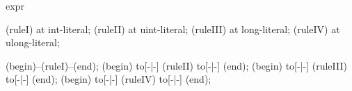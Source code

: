\begin{syntax}{expr}
  
  \node[nonterminal] (ruleI)  at  {int-literal};
  \node[nonterminal] (ruleII) at  {uint-literal};
  \node[nonterminal] (ruleIII) at  {long-literal};
  \node[nonterminal] (ruleIV) at  {ulong-literal};
  
  \draw[path] (begin)--(ruleI)--(end);
  \draw[path] (begin) to[-|-] (ruleII) to[-|-] (end);
  \draw[path] (begin) to[-|-] (ruleIII) to[-|-] (end);
  \draw[path] (begin) to[-|-] (ruleIV) to[-|-] (end);
\end{syntax}
